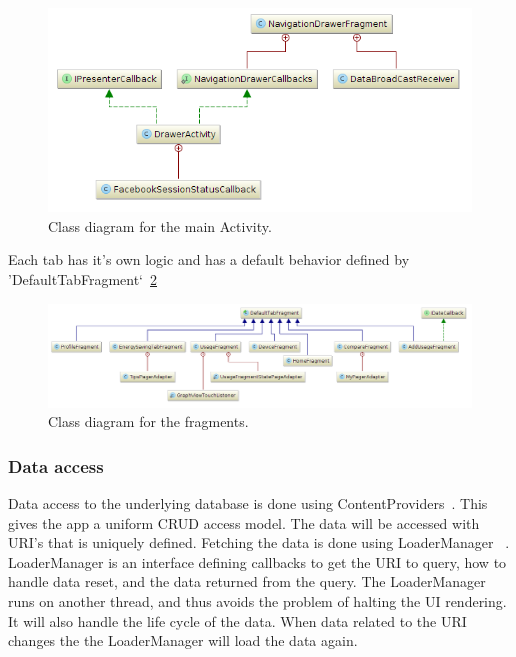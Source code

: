 \begin{figure}[H]
\includegraphics[width=\textwidth]{ch/architecture/fig/class_diagram_drawer.png}
\caption{Class diagram for the main Activity.}
\label{fig:class_diagram_drawer}
\end{figure}

Each tab has it's own logic and has a default behavior defined by 'DefaultTabFragment`~\ref{fig:class_diagram_fragments}

\begin{figure}[H]
\includegraphics[width=\textwidth]{ch/architecture/fig/class_diagram_fragments.png}
\caption{Class diagram for the fragments.}
\label{fig:class_diagram_fragments}
\end{figure}

\subsubsection{Data access}

Data access to the underlying database is done using ContentProviders~\cite{contentproviders}. This gives the app a uniform \gls{CRUD} access model. The data will be accessed with \gls{URI}'s that is uniquely defined. Fetching the data is done using LoaderManager~\cite{loadermanager} . LoaderManager is an interface defining callbacks to get the URI to query, how to handle data reset, and the data returned from the query. The LoaderManager runs on another thread, and thus avoids the problem of halting the UI rendering. It will also handle the life cycle of the data. When data related to the URI changes the the LoaderManager will load the data again. 

